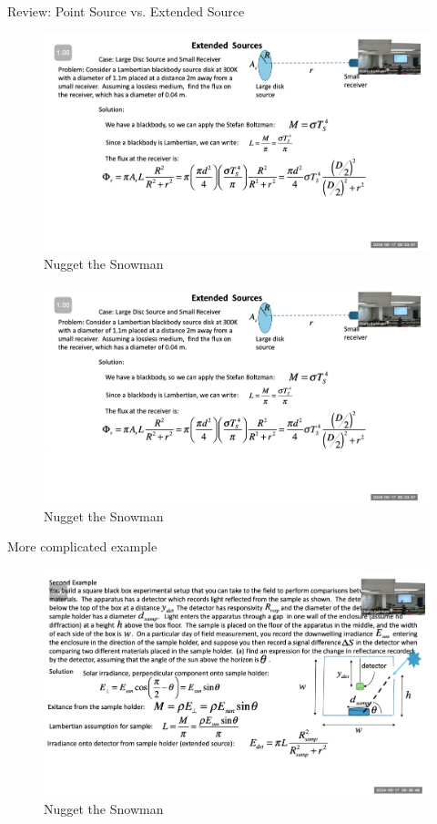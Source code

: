 \documentclass{article}
\begin{document}
Review: Point Source vs. Extended Source 
\begin{figure}[h!]
\centering
\includegraphics[scale=.6]{Radiometry/Week4/Notes/Sept17/SimpleExtendedSource.png}
\caption{Nugget the Snowman}
\label{fig:Simple Extended Source}
\end{figure}


\begin{figure}[h!]
\centering
\includegraphics[scale=.6]{Radiometry/Week4/Notes/Sept17/SimpleExtendedSource.png}
\caption{Nugget the Snowman}
\label{fig:Simple Extended Source}
\end{figure}



\clearpage 

More complicated example 


\begin{figure}[h!]
\centering
\includegraphics[scale=.6]{Radiometry/Week4/Notes/Sept17/Second.png}
\caption{Nugget the Snowman}
\label{fig:Simple Extended Source}
\end{figure}
\end{document}
